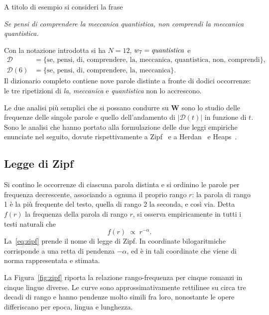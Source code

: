 A titolo di esempio si consideri la frase
\begin{center}
\emph{Se pensi di comprendere la meccanica quantistica, non comprendi la
meccanica quantistica.}
\end{center}
Con la notazione introdotta si ha $N = 12$, $w_7 = \text{\emph{quantistica}}$ e
\begin{align}
  \mathcal{D}    &= \{\text{se, pensi, di, comprendere, la, meccanica,
                          quantistica, non, comprendi}\}, \\
  \mathcal{D}(6) &= \{\text{se, pensi, di, comprendere, la, meccanica}\} .
\end{align}
Il dizionario completo contiene nove parole distinte a fronte di dodici
occorrenze: le tre ripetizioni di \emph{la}, \emph{meccanica} e
\emph{quantistica} non lo accrescono.

Le due analisi più semplici che si possano condurre su $\mathbf{W}$ sono lo
studio delle frequenze delle singole parole e quello dell'andamento di
$|\mathcal{D}(t)|$ in funzione di $t$. Sono le analisi che hanno portato alla
formulazione delle due leggi empiriche enunciate nel seguito, dovute
rispettivamente a Zipf~\cite{zipf1949} e a Herdan~\cite{herdan1964} e
Heaps~\cite{heaps1978}.

\subsection{Legge di Zipf}
\label{sec:zipf}

Si contino le occorrenze di ciascuna parola distinta e si ordinino le parole per
frequenza decrescente, associando a ognuna il proprio rango $r$: la parola di
rango 1 è la più frequente del testo, quella di rango 2 la seconda, e così via.
Detta $f(r)$ la frequenza della parola di rango $r$, si osserva empiricamente in
tutti i testi naturali che
\begin{equation}
  f(r) \;\propto\; r^{-\alpha}.
  \label{eq:zipf}
\end{equation}
La~\eqref{eq:zipf} prende il nome di legge di Zipf. In coordinate
bilogaritmiche corrisponde a una retta di pendenza $-\alpha$, ed è in tali
coordinate che viene di norma rappresentata e stimata.

La Figura~\ref{fig:zipf} riporta la relazione rango-frequenza per cinque romanzi
in cinque lingue diverse. Le curve sono approssimativamente rettilinee su circa
tre decadi di rango e hanno pendenze molto simili fra loro, nonostante le opere
differiscano per epoca, lingua e lunghezza.

